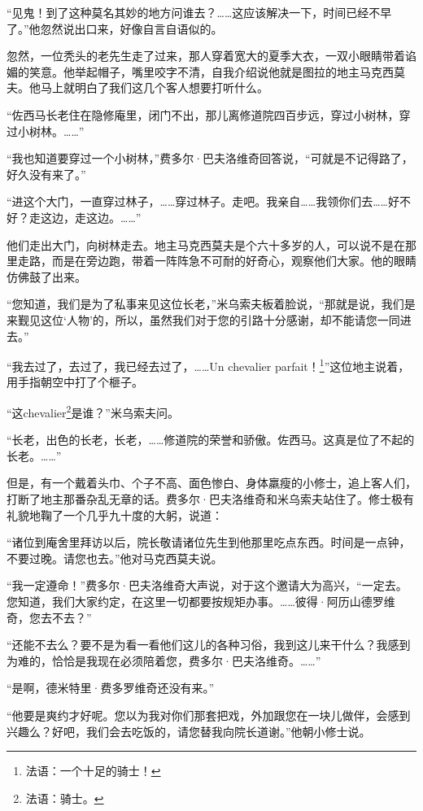 \par “见鬼！到了这种莫名其妙的地方问谁去？……这应该解决一下，时间已经不早了。”他忽然说出口来，好像自言自语似的。
\par 忽然，一位秃头的老先生走了过来，那人穿着宽大的夏季大衣，一双小眼睛带着谄媚的笑意。他举起帽子，嘴里咬字不清，自我介绍说他就是图拉的地主马克西莫夫。他马上就明白了我们这几个客人想要打听什么。
\par “佐西马长老住在隐修庵里，闭门不出，那儿离修道院四百步远，穿过小树林，穿过小树林。……”
\par “我也知道要穿过一个小树林，”费多尔·巴夫洛维奇回答说，“可就是不记得路了，好久没有来了。”
\par “进这个大门，一直穿过林子，……穿过林子。走吧。我亲自……我领你们去……好不好？走这边，走这边。……”
\par 他们走出大门，向树林走去。地主马克西莫夫是个六十多岁的人，可以说不是在那里走路，而是在旁边跑，带着一阵阵急不可耐的好奇心，观察他们大家。他的眼睛仿佛鼓了出来。
\par “您知道，我们是为了私事来见这位长老，”米乌索夫板着脸说，“那就是说，我们是来觐见这位‘人物’的，所以，虽然我们对于您的引路十分感谢，却不能请您一同进去。”
\par “我去过了，去过了，我已经去过了，……Un chevalier parfait！\footnote{法语：一个十足的骑士！}”这位地主说着，用手指朝空中打了个榧子。
\par “这chevalier\footnote{法语：骑士。}是谁？”米乌索夫问。
\par “长老，出色的长老，长老，……修道院的荣誉和骄傲。佐西马。这真是位了不起的长老。……”
\par 但是，有一个戴着头巾、个子不高、面色惨白、身体羸瘦的小修士，追上客人们，打断了地主那番杂乱无章的话。费多尔·巴夫洛维奇和米乌索夫站住了。修士极有礼貌地鞠了一个几乎九十度的大躬，说道：
\par “诸位到庵舍里拜访以后，院长敬请诸位先生到他那里吃点东西。时间是一点钟，不要过晚。请您也去。”他对马克西莫夫说。
\par “我一定遵命！”费多尔·巴夫洛维奇大声说，对于这个邀请大为高兴，“一定去。您知道，我们大家约定，在这里一切都要按规矩办事。……彼得·阿历山德罗维奇，您去不去？”
\par “还能不去么？要不是为看一看他们这儿的各种习俗，我到这儿来干什么？我感到为难的，恰恰是我现在必须陪着您，费多尔·巴夫洛维奇。……”
\par “是啊，德米特里·费多罗维奇还没有来。”
\par “他要是爽约才好呢。您以为我对你们那套把戏，外加跟您在一块儿做伴，会感到兴趣么？好吧，我们会去吃饭的，请您替我向院长道谢。”他朝小修士说。
